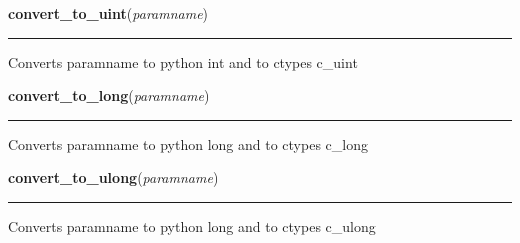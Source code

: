     \label{xformslib:library:convert_to_uint}

    \vspace{0.5ex}

\hspace{.8\funcindent}\begin{boxedminipage}{\funcwidth}

    \raggedright \textbf{convert\_to\_uint}(\textit{paramname})

    \vspace{-1.5ex}

    \rule{\textwidth}{0.5\fboxrule}
\setlength{\parskip}{2ex}
    Converts paramname to python int and to ctypes c\_uint

\setlength{\parskip}{1ex}
    \end{boxedminipage}

    \label{xformslib:library:convert_to_long}

    \vspace{0.5ex}

\hspace{.8\funcindent}\begin{boxedminipage}{\funcwidth}

    \raggedright \textbf{convert\_to\_long}(\textit{paramname})

    \vspace{-1.5ex}

    \rule{\textwidth}{0.5\fboxrule}
\setlength{\parskip}{2ex}
    Converts paramname to python long and to ctypes c\_long

\setlength{\parskip}{1ex}
    \end{boxedminipage}

    \label{xformslib:library:convert_to_ulong}

    \vspace{0.5ex}

\hspace{.8\funcindent}\begin{boxedminipage}{\funcwidth}

    \raggedright \textbf{convert\_to\_ulong}(\textit{paramname})

    \vspace{-1.5ex}

    \rule{\textwidth}{0.5\fboxrule}
\setlength{\parskip}{2ex}
    Converts paramname to python long and to ctypes c\_ulong

\setlength{\parskip}{1ex}
    \end{boxedminipage}

